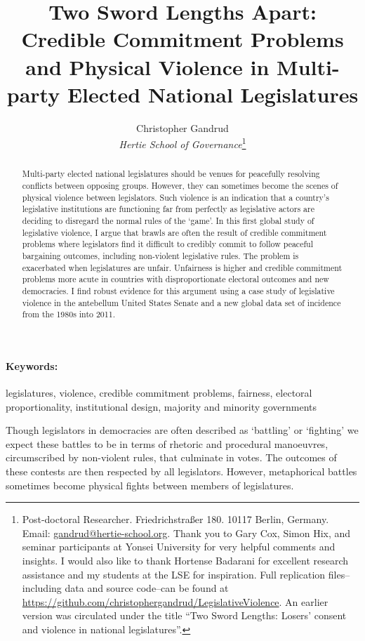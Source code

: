\documentclass[a4paper]{article}\usepackage[]{graphicx}\usepackage[]{color}
\title{Two Sword Lengths Apart: Credible Commitment Problems and Physical Violence in Multi-party Elected National Legislatures}
\author{Christopher Gandrud \\
                {\emph{Hertie School of Governance}}\footnote{Post-doctoral Researcher. Friedrichstra{\ss}er 180. 10117 Berlin, Germany. Email: \href{mailto:gandrud@hertie-school.org}{gandrud@hertie-school.org}. Thank you to Gary Cox, Simon Hix, and seminar participants at Yonsei University for very helpful comments and insights. I would also like to thank Hortense Badarani for excellent research assistance and my students at the LSE for inspiration. Full replication files--including data and source code--can be found at \url{https://github.com/christophergandrud/LegislativeViolence}. An earlier version was circulated under the title ``Two Sword Lengths: Losers' consent and violence in national legislatures''.}}
\begin{document}
\maketitle

\begin{abstract}
Multi-party elected national legislatures should be venues for peacefully resolving conflicts between opposing groups. However, they can sometimes become the scenes of physical violence between legislators. Such violence is an indication that a country's legislative institutions are functioning far from perfectly as legislative actors are deciding to disregard the normal rules of the `game'. In this first global study of legislative violence, I argue that brawls are often the result of credible commitment problems where legislators find it difficult to credibly commit to follow peaceful bargaining outcomes, including non-violent legislative rules. The problem is exacerbated when legislatures are unfair. Unfairness is higher and credible commitment problems more acute in countries with disproportionate electoral outcomes and new democracies. I find robust evidence for this argument using a case study of legislative violence in the antebellum United States Senate and a new global data set of incidence from the 1980s into 2011.
\end{abstract}


\paragraph{Keywords:} legislatures, violence, credible commitment problems, fairness, electoral proportionality, institutional design, majority and minority governments

\vspace{0.3cm}


Though legislators in democracies are often described as `battling' or `fighting' we expect these battles to be in terms of rhetoric and procedural manoeuvres, circumscribed by non-violent rules, that culminate in votes. The outcomes of these contests are then respected by all legislators. However, metaphorical battles sometimes become physical fights between members of legislatures. 
\end{document}
